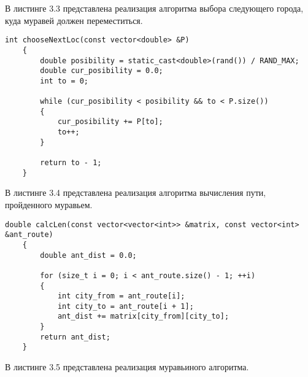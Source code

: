 \clearpage

В листинге 3.3 представлена реализация алгоритма выбора следующего города, куда муравей должен переместиться.

\begin{lstlisting}[caption=Алгоритм  выбора следующего города]
	int chooseNextLoc(const vector<double> &P) 
	{
		double posibility = static_cast<double>(rand()) / RAND_MAX;
		double cur_posibility = 0.0;
		int to = 0;
		
		while (cur_posibility < posibility && to < P.size()) 
		{
			cur_posibility += P[to];
			to++;
		}
		
		return to - 1;
	}  
\end{lstlisting}

В листинге 3.4 представлена реализация алгоритма вычисления пути, пройденного муравьем.

\begin{lstlisting}[caption=Алгоритм  вычисления пути]
	double calcLen(const vector<vector<int>> &matrix, const vector<int> &ant_route) 
	{
		double ant_dist = 0.0;
		
		for (size_t i = 0; i < ant_route.size() - 1; ++i) 
		{
			int city_from = ant_route[i];
			int city_to = ant_route[i + 1];
			ant_dist += matrix[city_from][city_to];
		}
		return ant_dist;
	}
\end{lstlisting}

\clearpage

В листинге 3.5 представлена реализация муравьиного алгоритма.


